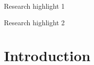 \documentclass[preprint,12pt]{elsarticle}
\begin{document}
\begin{frontmatter}
\begin{graphicalabstract}
\end{graphicalabstract}

\begin{highlights}
\item Research highlight 1
\item Research highlight 2
\end{highlights}

\begin{keyword}



\end{keyword}

\end{frontmatter}


\section{Introduction} \label{sec:intro}
\end{document}
